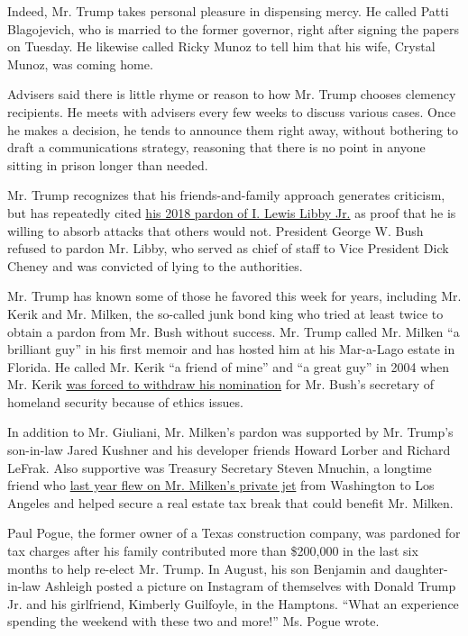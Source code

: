 Indeed, Mr. Trump takes personal pleasure in dispensing mercy. He called
Patti Blagojevich, who is married to the former governor, right after
signing the papers on Tuesday. He likewise called Ricky Munoz to tell
him that his wife, Crystal Munoz, was coming home.

Advisers said there is little rhyme or reason to how Mr. Trump chooses
clemency recipients. He meets with advisers every few weeks to discuss
various cases. Once he makes a decision, he tends to announce them right
away, without bothering to draft a communications strategy, reasoning
that there is no point in anyone sitting in prison longer than needed.

Mr. Trump recognizes that his friends-and-family approach generates
criticism, but has repeatedly cited
\href{https://www.nytimes.com/2018/04/13/us/politics/trump-pardon-scooter-libby.html}{his
2018 pardon of I. Lewis Libby Jr.} as proof that he is willing to absorb
attacks that others would not. President George W. Bush refused to
pardon Mr. Libby, who served as chief of staff to Vice President Dick
Cheney and was convicted of lying to the authorities.

Mr. Trump has known some of those he favored this week for years,
including Mr. Kerik and Mr. Milken, the so-called junk bond king who
tried at least twice to obtain a pardon from Mr. Bush without success.
Mr. Trump called Mr. Milken ``a brilliant guy'' in his first memoir and
has hosted him at his Mar-a-Lago estate in Florida. He called Mr. Kerik
``a friend of mine'' and ``a great guy'' in 2004 when Mr. Kerik
\href{https://www.nytimes.com/2004/12/11/politics/kerik-pulls-out-as-bush-nominee-for-homeland-security-job.html}{was
forced to withdraw his nomination} for Mr. Bush's secretary of homeland
security because of ethics issues.

In addition to Mr. Giuliani, Mr. Milken's pardon was supported by Mr.
Trump's son-in-law Jared Kushner and his developer friends Howard Lorber
and Richard LeFrak. Also supportive was Treasury Secretary Steven
Mnuchin, a longtime friend who
\href{https://www.nytimes.com/2019/01/18/us/politics/mnuchin-private-flight-michael-milken.html}{last
year flew on Mr. Milken's private jet} from Washington to Los Angeles
and helped secure a real estate tax break that could benefit Mr. Milken.

Paul Pogue, the former owner of a Texas construction company, was
pardoned for tax charges after his family contributed more than
\$200,000 in the last six months to help re-elect Mr. Trump. In August,
his son Benjamin and daughter-in-law Ashleigh posted a picture on
Instagram of themselves with Donald Trump Jr. and his girlfriend,
Kimberly Guilfoyle, in the Hamptons. ``What an experience spending the
weekend with these two and more!'' Ms. Pogue wrote.

